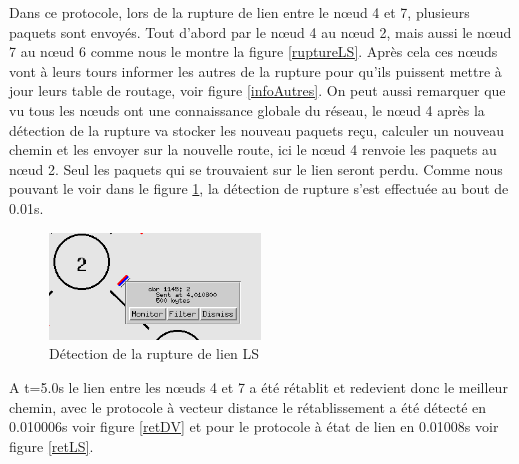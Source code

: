 \documentclass[11pt]{article}
\begin{document}
Dans ce protocole, lors de la rupture de lien entre le nœud 4 et 7, plusieurs paquets sont envoyés. Tout d'abord par le nœud 4 au nœud 2, mais aussi le nœud 7 au nœud 6 comme nous le montre la figure \ref{ruptureLS}. Après cela ces nœuds vont à leurs tours informer les autres de la rupture pour qu'ils puissent mettre à jour leurs table de routage, voir figure \ref{infoAutres}. On peut aussi remarquer que vu tous les nœuds ont une connaissance globale du réseau, le nœud 4 après la détection de la rupture va stocker les nouveau paquets reçu, calculer un nouveau chemin et les envoyer sur la nouvelle route, ici le nœud 4 renvoie les paquets au nœud 2. Seul les paquets qui se trouvaient sur le lien seront perdu. Comme nous pouvant le voir dans le figure \ref{detectRuptureLS}, la détection de rupture s’est effectuée au bout de 0.01s.


\begin{figure}[H]
	\begin{center}
		\includegraphics[width=0.5\textwidth]{assets/tp2/DetecterRuptureLS.png}
	\end{center}
	\caption{Détection de la rupture de lien LS}
	\label{detectRuptureLS}
\end{figure}


A t=5.0s le lien entre les nœuds 4 et 7 a été rétablit et redevient donc le meilleur chemin, avec le protocole à vecteur distance le rétablissement a été détecté en 0.010006s voir figure \ref{retDV} et pour le protocole à état de lien en 0.01008s voir figure \ref{retLS}.
\end{document}

